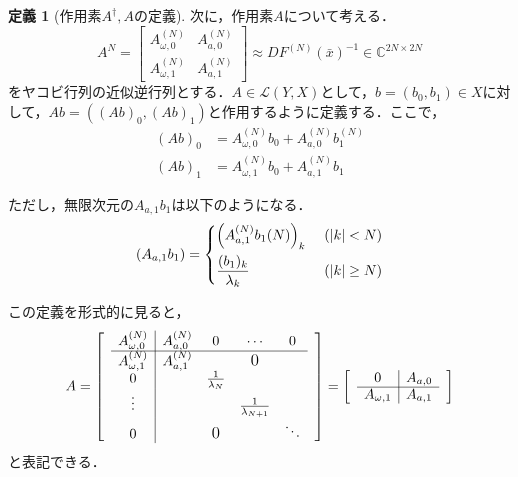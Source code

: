\documentclass[11pt,a4paper,titlepage]{jsreport}
\theoremstyle{definition}
\newtheorem{dfn}{定義}
\begin{document}
\begin{dfn}[作用素$A^\dagger,A$の定義]
  次に，$作用素A$について考える．
  \begin{equation*}
    A^{N} = \begin{bmatrix}
      A_{\omega,0}^{(N)} & A_{a,0}^{(N)} \\
      A_{\omega,1}^{(N)} & A_{a,1}^{(N)}
    \end{bmatrix}
    \approx DF^{(N)} \left(\bar{x}\right)^{-1} \in \mathbb{C}^{2N\times 2N}
  \end{equation*}
  をヤコビ行列の近似逆行列とする．$A\in\mathcal{L}(Y,X)$として，$b=\left(b_0,b_1\right)\in X$に対して，$Ab=\left((Ab)_0,(Ab)_1\right)$と作用するように定義する．ここで，
  \begin{align*}
    (Ab)_0 & = A_{\omega,0}^{(N)}b_0 + A_{a,0}^{(N)} b_1^{(N)} \\
    (Ab)_1 & = A_{\omega,1}^{(N)}b_0 + A_{a,1}^{(N)} b_1
  \end{align*}

  ただし，無限次元の$A_{a,1}b_1$は以下のようになる．
  \begin{equation*}
    \left(A_{a,1}b_1\right)=\begin{dcases}
      \left(A_{a,1}^{(N)}b_1{(N)}\right)_k & \ (|k|<N)     \\
      \frac{(b_1)_k}{\lambda_k}            & \ (|k|\geq N)
    \end{dcases}
  \end{equation*}

  この定義を形式的に見ると，
  \begin{equation*}
    A =
    \begin{bmatrix}
       & \multicolumn{1}{c|}{A_{\omega,0}^{(N)}} & A_{a,0}^{(N)} & 0                   & \cdots                  & 0      & \\ \cline{2-6}
       & \multicolumn{1}{c|}{A_{\omega,1}^{(N)}} & A_{a,1}^{(N)} &                     & \text{\large{0}}        &        & \\
       & \multicolumn{1}{c|}{0}                  &               & \frac{1}{\lambda_N} &                         &        & \\
       & \multicolumn{1}{c|}{\vdots}             &               &                     & \frac{1}{\lambda_{N+1}} &        & \\
       & \multicolumn{1}{c|}{0}                  &               & \text{\large{0}}    &                         & \ddots & \\
    \end{bmatrix}
    =
    \begin{bmatrix}
       & \multicolumn{1}{c|}{0}            & A_{a,0} & \\ \cline{2-3}
       & \multicolumn{1}{c|}{A_{\omega,1}} & A_{a,1} &
    \end{bmatrix}
  \end{equation*}
  と表記できる．
\end{dfn}
\end{document}
